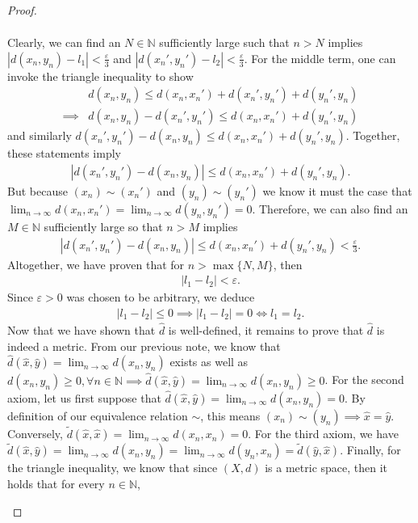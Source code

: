 \documentclass[11pt]{article}
\theoremstyle{mystyle}
\begin{document}
\begin{proof}
\begin{enumerate}[(a)]
\begin{align*}
\end{align*}
Clearly, we can find an $N \in \mathbb{N}$ sufficiently large such that $n > N$ implies $|d(x_n, y_n) - l_1| < \frac{\varepsilon}{3}$ and $|d(x_n', y_n') - l_2| < \frac{\varepsilon}{3}$. For the middle term, one can invoke the triangle inequality to show
\begin{align*}
    &d(x_n, y_n) \leq d(x_n, x_n') + d(x_n', y_n') + d(y_n', y_n)\\
    \implies&d(x_n, y_n) - d(x_n', y_n') \leq d(x_n, x_n') + d(y_n', y_n)
\end{align*}
and similarly $d(x_n', y_n') - d(x_n, y_n) \leq d(x_n, x_n') + d(y_n', y_n)$. Together, these statements imply \begin{align*}
    |d(x_n', y_n') - d(x_n, y_n)| \leq d(x_n, x_n') + d(y_n', y_n).
\end{align*}
But because $(x_n) \sim (x_n')$ and $(y_n) \sim (y_n')$ we know it must the case that $\lim_{n \to \infty} d(x_n, x_n') = \lim_{n \to \infty} d(y_n, y_n') = 0$. Therefore, we can also find an $M \in \mathbb{N}$ sufficiently large so that $n > M$ implies
\begin{align*}
    |d(x_n', y_n') - d(x_n, y_n)| \leq d(x_n, x_n') + d(y_n', y_n) < \frac{\varepsilon}{3}.
\end{align*}
Altogether, we have proven that for $n > \max\{N, M\}$, then
\begin{align*}
    |l_1 - l_2| < \varepsilon.
\end{align*}
Since $\varepsilon > 0$ was chosen to be arbitrary, we deduce
\begin{align*}
    |l_1 - l_2| \leq 0 \implies |l_1 - l_2| = 0 \iff l_1 = l_2.
\end{align*}\newline
Now that we have shown that $\hat{d}$ is well-defined, it remains to prove that $\hat{d}$ is indeed a metric. From our previous note, we know that $\hat{d}(\hat{x}, \hat{y}) = \lim_{n \to \infty} d(x_n, y_n)$ exists as well as $d(x_n, y_n) \geq 0, \forall n \in \mathbb{N} \implies \hat{d}(\hat{x}, \hat{y}) = \lim_{n \to \infty} d(x_n, y_n) \geq 0$. For the second axiom, let us first suppose that $\hat{d}(\hat{x}, \hat{y}) = \lim_{n \to \infty} d(x_n, y_n) = 0$. By definition of our equivalence relation $\sim$, this means $(x_n) \sim (y_n) \implies \hat{x} = \hat{y}$. Conversely, $\tilde{d}(\hat{x}, \hat{x}) = \lim_{n\to \infty} d(x_n, x_n) = 0$. For the third axiom, we have $\tilde{d}(\hat{x}, \hat{y}) = \lim_{n \to \infty} d(x_n, y_n) = \lim_{n \to \infty} d(y_n, x_n) = \tilde{d}(\hat{y}, \hat{x})$. Finally, for the triangle inequality, we know that since $(X, d)$ is a metric space, then it holds that for every $n \in \mathbb{N}$,

\end{enumerate}
\end{proof}
\end{document}

